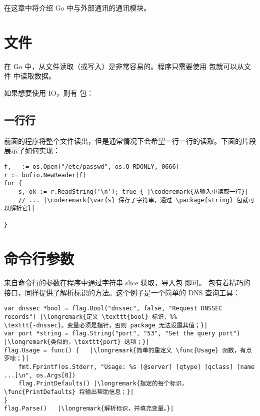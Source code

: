 \noindent{}在这章中将介绍 Go 中与外部通讯的通讯模块。

\section{文件}
在 Go 中，从文件读取（或写入）是非常容易的。程序只需要使用
 包就可以从文件  中读取数据。

\showremarks

如果想要使用 IO，则有
 包：

\showremarks

\subsection{一行行}
前面的程序将整个文件读出，但是通常情况下会希望一行一行的读取。下面的片段展示了如何实现：

\begin{lstlisting}
f, _ := os.Open("/etc/passwd", os.O_RDONLY, 0666)
r := bufio.NewReader(f)
for {
    s, ok := r.ReadString('\n'); true { |\coderemark{从输入中读取一行}|
    // ... |\coderemark{\var{s} 保存了字符串，通过 \package{string} 包就可以解析它}|

}
\end{lstlisting}

\section{命令行参数}
\label{sec:option parsing}
来自命令行的参数在程序中通过字符串 slice  获取，导入包  即可。
 包有着精巧的接口，同样提供了解析标识的方法。这个例子是一个简单的 DNS 查询工具：
\begin{lstlisting}
var dnssec *bool = flag.Bool("dnssec", false, "Request DNSSEC records") |\longremark{定义 \texttt{bool} 标识，%%
\texttt{-dnssec}。变量必须是指针，否则 package 无法设置其值；}|
var port *string = flag.String("port", "53", "Set the query port")      |\longremark{类似的，\texttt{port} 选项；}|
flag.Usage = func() {   |\longremark{简单的重定义 \func{Usage} 函数，有点罗嗦；}|
    fmt.Fprintf(os.Stderr, "Usage: %s [@server] [qtype] [qclass] [name ...]\n", os.Args[0])
    flag.PrintDefaults() |\longremark{指定的每个标识，\func{PrintDefaults} 将输出帮助信息；}|
}
flag.Parse()   |\longremark{解析标识，并填充变量。}|
\end{lstlisting}
\showremarks

